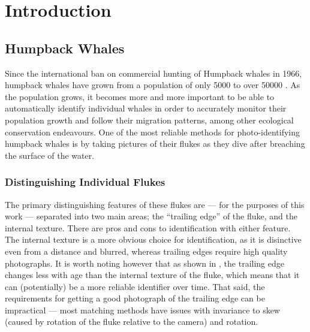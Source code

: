  
\chapter{Introduction} \label{sec:introduction}
 
\section{Humpback Whales}

Since the international ban on commercial hunting of Humpback whales in 1966, humpback whales have grown from a population of only 5000 \cite{baker1993abundant} to over 50000 \cite{branch2011humpback}. 
As the population grows, it becomes more and more important to be able to automatically identify individual whales in order to accurately monitor their population growth and follow their migration patterns, among other ecological conservation endeavours.
One of the most reliable methods for photo-identifying humpback whales is by taking pictures of their flukes as they dive after breaching the surface of the water.


\subsection{Distinguishing Individual Flukes}

The primary distinguishing features of these flukes are --- for the purposes of this work --- separated into two main areas; the ``trailing edge'' of the fluke, and the internal texture.
There are pros and cons to identification with either feature.
The internal texture is a more obvious choice for identification, as it is disinctive even from a distance and blurred, whereas trailing edges require high quality photographs.
It is worth noting however that as shown in \cite{blackmer2000temporal}, the trailing edge changes less with age than the internal texture of the fluke, which means that it can (potentially) be a more reliable identifier over time.
That said, the requirements for getting a good photograph of the trailing edge can be impractical --- most matching methods have issues with invariance to skew (caused by rotation of the fluke relative to the camera) and rotation. %

